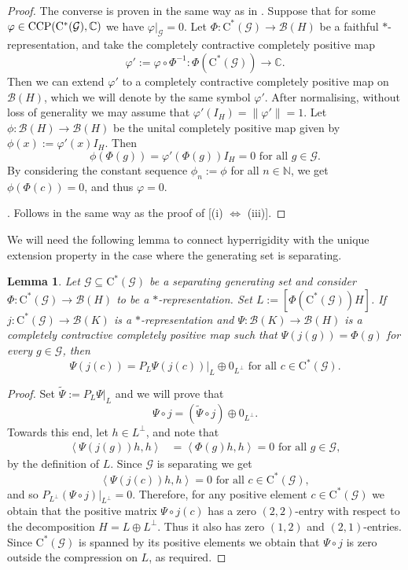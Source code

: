 \documentclass[11pt, draft]{amsart}
\numberwithin{equation}{section}
\theoremstyle{plain}
\newtheorem{lemma}[theorem]{Lemma}
\theoremstyle{definition}
\theoremstyle{remark}
\newcommand{\B}{{\mathcal{B}}}
\newcommand{\G}{{\mathcal{G}}}
\newcommand\vphi{\varphi}
\newcommand{\bC}{\mathbb{C}}
\newcommand{\bN}{\mathbb{N}}
\newcommand{\foral}{\text{ for all }}
\newcommand{\ca}{\mathrm{C}^*}
\newcommand{\wt}{\widetilde}
\newcommand{\sca}[1]{\left\langle#1\right\rangle} %
\begin{document}
\begin{proof}
The converse is proven in the same way as in \cite[Theorem 3.3, (ii) implies (v)]{Sal17}.
Suppose that for some $\vphi \in  {\rm CCP}(\ca(\G), \bC)$ we have $\vphi|_{\G} = 0$.
Let $\Phi \colon \ca(\G) \to \B(H)$ be a faithful $*$-representation, and take the completely contractive completely positive map 
\[
\vphi' := \vphi \circ \Phi^{-1} \colon \Phi(\ca(\G)) \to \bC.
\]
Then we can extend $\vphi'$ to a completely contractive completely positive map on $\B(H)$, which we will denote by the same symbol $\vphi'$. 
After normalising, without loss of generality we may assume that $\vphi'(I_H) = \|\vphi'\| = 1$.
Let $\phi \colon \B(H) \to \B(H)$ be the unital completely positive map given by $\phi(x) := \vphi'(x) I_H$.
Then 
\[
\phi(\Phi(g)) = \vphi'(\Phi(g))I_H = 0
\foral g \in \G.
\]
By considering the constant sequence $\phi_n := \phi$ for all $n \in \bN$, we get $\phi(\Phi(c)) = 0$, and thus $\vphi = 0$.

\smallskip

\noindent
[(i) $\Leftrightarrow$ (iv)].
Follows in the same way as the proof of [(i) $\Leftrightarrow$ (iii)].
\end{proof}
We will need the following lemma to connect hyperrigidity with the unique extension property in the case where the generating set is separating.

\begin{lemma}\label{L:sepdecomp}
Let $\G\subseteq \ca(\G)$ be a separating generating set and consider $\Phi \colon \ca(\G) \to \B(H)$ to be a $*$-representation. 
Set $L:= [\Phi(\ca(\G)) H]$. If $j\colon \ca(\G)\to \B(K)$ is a $*$-representation and $\Psi\colon \B(K)\to \B(H)$ is a completely contractive completely positive map such that $\Psi(j(g))=\Phi(g)$ for every $g\in \G$, then 
\[
\Psi(j(c))=P_L \Psi(j(c))|_L\oplus 0_{L^\perp} \foral c\in \ca(\G).
\]
\end{lemma}
\begin{proof}
Set $\wt{\Psi}:=P_L \Psi|_L$ and we will prove that
\[
\Psi \circ j 
=
(\wt{\Psi} \circ j) \oplus 0_{L^{\perp}}.
\]
Towards this end, let $h \in L^\perp$, and note that
\begin{align*}
\sca{\Psi(j(g))h,h}
& =
\sca{\Phi(g)h,h}
=
0
\foral g \in \G,
\end{align*}
by the definition of $L$.
Since $\G$ is separating we get
\[
\sca{\Psi(j(c))h,h}
=
0
\foral c \in \ca(\G),
\]
and so $P_{L^\perp} (\Psi \circ j) |_{L^\perp} = 0$. 
Therefore, for any positive element $c\in\ca(\G)$ we obtain that the positive matrix $\Psi \circ j(c)$ has a zero $(2,2)$-entry with respect to the decomposition $H=L\oplus L^\perp$. Thus it also has zero $(1,2)$ and $(2,1)$-entries.
Since $\ca(\G)$ is spanned by its positive elements we obtain that $\Psi \circ j $ is zero outside the compression on $L$, as required.
\end{proof}
\end{document}
